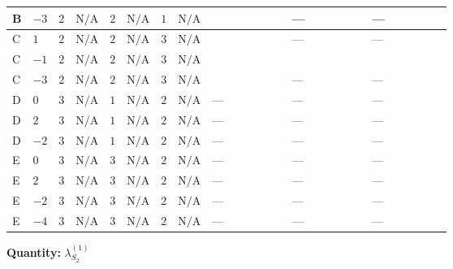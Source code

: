 \documentclass[8pt]{article}
\begin{document}
\begin{landscape}
\begin{longtable}{@{}llcccccc >{\raggedright\arraybackslash}p{0.21\linewidth} >{\raggedright\arraybackslash}p{0.21\linewidth} >{\raggedright\arraybackslash}p{0.21\linewidth}@{}}
\midrule
B & $-3$ & $2$ & $\text{N/A}$ & $2$ & $\text{N/A}$ & $1$ & $\text{N/A}$ & \scriptsize\adjustbox{max width=\linewidth}{$\begin{gathered} +\frac{{\lambda_{HS_2}^{(A)}}^2}{4}\end{gathered}$} & --- & --- \\
\midrule
C & $1$ & $2$ & $\text{N/A}$ & $2$ & $\text{N/A}$ & $3$ & $\text{N/A}$ & \scriptsize\adjustbox{max width=\linewidth}{$\begin{gathered} +\frac{{\lambda_{HS_2}^{(A)}}^2}{4}\end{gathered}$} & --- & --- \\
\midrule
C & $-1$ & $2$ & $\text{N/A}$ & $2$ & $\text{N/A}$ & $3$ & $\text{N/A}$ & \scriptsize\adjustbox{max width=\linewidth}{$\begin{gathered} +\frac{{\lambda_{HS_2}^{(A)}}^2}{4}\end{gathered}$} & \scriptsize\adjustbox{max width=\linewidth}{$\begin{gathered} 8 {\lambda_{8}} \left({\lambda_{8}}\right)^{*}\end{gathered}$} & \scriptsize\adjustbox{max width=\linewidth}{$\begin{gathered} +8 {\lambda_{9}} \left({\lambda_{9}}\right)^{*}\end{gathered}$} \\
\midrule
C & $-3$ & $2$ & $\text{N/A}$ & $2$ & $\text{N/A}$ & $3$ & $\text{N/A}$ & \scriptsize\adjustbox{max width=\linewidth}{$\begin{gathered} +\frac{{\lambda_{HS_2}^{(A)}}^2}{4}\end{gathered}$} & --- & --- \\
\midrule
D & $0$ & $3$ & $\text{N/A}$ & $1$ & $\text{N/A}$ & $2$ & $\text{N/A}$ & --- & --- & --- \\
\midrule
D & $2$ & $3$ & $\text{N/A}$ & $1$ & $\text{N/A}$ & $2$ & $\text{N/A}$ & --- & --- & --- \\
\midrule
D & $-2$ & $3$ & $\text{N/A}$ & $1$ & $\text{N/A}$ & $2$ & $\text{N/A}$ & --- & --- & --- \\
\midrule
E & $0$ & $3$ & $\text{N/A}$ & $3$ & $\text{N/A}$ & $2$ & $\text{N/A}$ & --- & --- & --- \\
\midrule
E & $2$ & $3$ & $\text{N/A}$ & $3$ & $\text{N/A}$ & $2$ & $\text{N/A}$ & --- & --- & --- \\
\midrule
E & $-2$ & $3$ & $\text{N/A}$ & $3$ & $\text{N/A}$ & $2$ & $\text{N/A}$ & --- & --- & --- \\
\midrule
E & $-4$ & $3$ & $\text{N/A}$ & $3$ & $\text{N/A}$ & $2$ & $\text{N/A}$ & --- & --- & --- \\
\midrule
\bottomrule
\end{longtable}
\clearpage
\noindent\textbf{Quantity: }$\lambda_{S_2}^{(1)}$\par\smallskip

\end{landscape}
\end{document}
